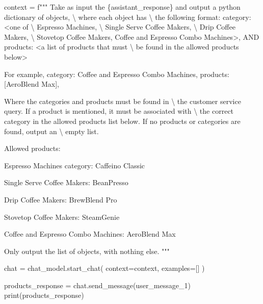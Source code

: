 \documentclass[
  letterpaper,
  DIV=11,
  numbers=noendperiod]{scrreprt}
\newenvironment{Shaded}{\begin{snugshade}}{\end{snugshade}}
\newcommand{\BuiltInTok}[1]{\textcolor[rgb]{0.00,0.23,0.31}{#1}}
\newcommand{\CharTok}[1]{\textcolor[rgb]{0.13,0.47,0.30}{#1}}
\newcommand{\NormalTok}[1]{\textcolor[rgb]{0.00,0.23,0.31}{#1}}
\newcommand{\OperatorTok}[1]{\textcolor[rgb]{0.37,0.37,0.37}{#1}}
\newcommand{\SpecialCharTok}[1]{\textcolor[rgb]{0.37,0.37,0.37}{#1}}
\newcommand{\SpecialStringTok}[1]{\textcolor[rgb]{0.13,0.47,0.30}{#1}}
\begin{document}
\begin{Shaded}
\begin{Highlighting}[]
\NormalTok{context }\OperatorTok{=} \SpecialStringTok{f"""}
\SpecialStringTok{Take as input the }\SpecialCharTok{\{}\NormalTok{assistant\_response}\SpecialCharTok{\}}\SpecialStringTok{ and output a python dictionary of objects, }\CharTok{\textbackslash{}}
\SpecialStringTok{where each object has }\CharTok{\textbackslash{}}
\SpecialStringTok{the following format:}
\SpecialStringTok{    \textquotesingle{}category\textquotesingle{}: \textless{}one of }\CharTok{\textbackslash{}}
\SpecialStringTok{    Espresso Machines, }\CharTok{\textbackslash{}}
\SpecialStringTok{    Single Serve Coffee Makers, }\CharTok{\textbackslash{}}
\SpecialStringTok{    Drip Coffee Makers, }\CharTok{\textbackslash{}}
\SpecialStringTok{    Stovetop Coffee Makers,}
\SpecialStringTok{    Coffee and Espresso Combo Machines\textgreater{},}
\SpecialStringTok{AND}
\SpecialStringTok{    \textquotesingle{}products\textquotesingle{}: \textless{}a list of products that must }\CharTok{\textbackslash{}}
\SpecialStringTok{    be found in the allowed products below\textgreater{}}

\SpecialStringTok{For example,}
\SpecialStringTok{  \textquotesingle{}category\textquotesingle{}: \textquotesingle{}Coffee and Espresso Combo Machines\textquotesingle{}, \textquotesingle{}products\textquotesingle{}: [\textquotesingle{}AeroBlend Max\textquotesingle{}],}

\SpecialStringTok{Where the categories and products must be found in }\CharTok{\textbackslash{}}
\SpecialStringTok{the customer service query.}
\SpecialStringTok{If a product is mentioned, it must be associated with }\CharTok{\textbackslash{}}
\SpecialStringTok{the correct category in the allowed products list below.}
\SpecialStringTok{If no products or categories are found, output an }\CharTok{\textbackslash{}}
\SpecialStringTok{empty list.}

\SpecialStringTok{Allowed products:}

\SpecialStringTok{Espresso Machines category:}
\SpecialStringTok{Caffeino Classic}

\SpecialStringTok{Single Serve Coffee Makers:}
\SpecialStringTok{BeanPresso}

\SpecialStringTok{Drip Coffee Makers:}
\SpecialStringTok{BrewBlend Pro}

\SpecialStringTok{Stovetop Coffee Makers:}
\SpecialStringTok{SteamGenie}

\SpecialStringTok{Coffee and Espresso Combo Machines:}
\SpecialStringTok{AeroBlend Max}

\SpecialStringTok{Only output the list of objects, with nothing else.}
\SpecialStringTok{"""}

\NormalTok{chat }\OperatorTok{=}\NormalTok{ chat\_model.start\_chat(}
\NormalTok{    context}\OperatorTok{=}\NormalTok{context,}
\NormalTok{    examples}\OperatorTok{=}\NormalTok{[]}
\NormalTok{)}

\NormalTok{products\_response }\OperatorTok{=}\NormalTok{ chat.send\_message(user\_message\_1)}
\BuiltInTok{print}\NormalTok{(products\_response)}
\end{Highlighting}
\end{Shaded}
\end{document}
